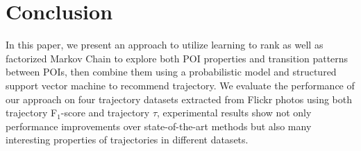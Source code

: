 \section{Conclusion}
\label{sec:conclusion}
In this paper, we present an approach to utilize learning to rank as well as factorized Markov Chain to explore both
POI properties and transition patterns between POIs, then combine them using a probabilistic model and structured 
support vector machine to recommend trajectory. 
We evaluate the performance of our approach on four trajectory datasets extracted from Flickr photos using both 
trajectory F$_1$-score and trajectory $\tau$, experimental results show not only performance improvements over 
state-of-the-art methods but also many interesting properties of trajectories in different datasets.
